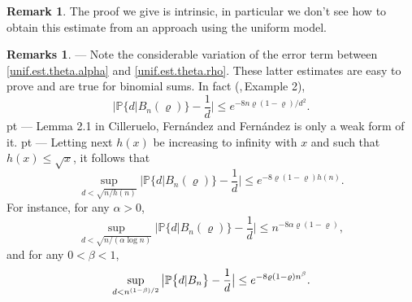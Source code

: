 \documentclass[11pt,draft,reqno]{amsart}
\theoremstyle{definition}
\theoremstyle{remarks}
\newtheorem{remarks}[theorem]{{\bf  Remarks}}
\newtheorem{remark}[theorem]{{\bf  Remark}}
\numberwithin{equation}{section}
\def \a{{\alpha}}
\def \b{{\beta}}
\def \noi{{\noindent}}
\def\P{{\mathcal P}}
\def\P{{\mathbb P}}
\begin{document}
 \begin{remark}\label{unif.est.theta.alpha.rem}\rm  The proof we give is intrinsic, in particular we don't see how to  obtain this estimate from an approach using the uniform model.
 \end{remark}
\begin{remarks} \label{rem.Ex.2}\rm  --- Note  the
considerable variation of the error term between \eqref{unif.est.theta.alpha} and \eqref{unif.est.theta.rho}. 
These latter estimates are easy to prove and are true for binomial sums.  
In fact (\cite{DS},\,Example 2),
 \begin{equation}\label{multiple} \Big|\P\big\{d|B_n(\varrho) \}- \frac{1}{d}\Big|\le 
 e^{-        {
 8n \varrho(1-\varrho)  /  d^2}  }.
\end{equation} 
 pt
 \noi ---  Lemma 2.1 in      Cilleruelo,   Fern\'andez and Fern\'andez \cite{CFF} is only a weak  form of it. 
 pt
\noi  --- Letting next $h(x)$ be increasing to infinity with $x$ and such that $h(x)\le  \sqrt x $, it follows that
 \begin{equation}\label{multiple.h} \sup_{d< \sqrt{  n/ h(n)}}\Big|\P\big\{d|B_n(\varrho) \}- \frac{1}{d}\Big|\le 
 e^{-    8  
   \varrho(1-\varrho) h(n)  }.
\end{equation} 
   For instance,  
for any $\a>0$,   
 \begin{equation}\label{unifdivalpha}  \sup_{d< \sqrt{  n/ (\a \log n)}}\Big|\P\big\{d|B_n(\varrho) \}- \frac{1}{d}\Big|\le 
 n^{-    8  \a
   \varrho(1-\varrho)  },  
\end{equation} and  for any $0<\b<1 $,   
\begin{equation}\label{unifdivro} \sup_{d<   n^{(1-\b)/2} }\big|\P\big\{  d|   B_{ n} \big\}-{1\over d} 
\big|\le e^{- 8   
   \varrho(1-\varrho) n^\b}. 
\end{equation}
\end{remarks} 
\end{document}
